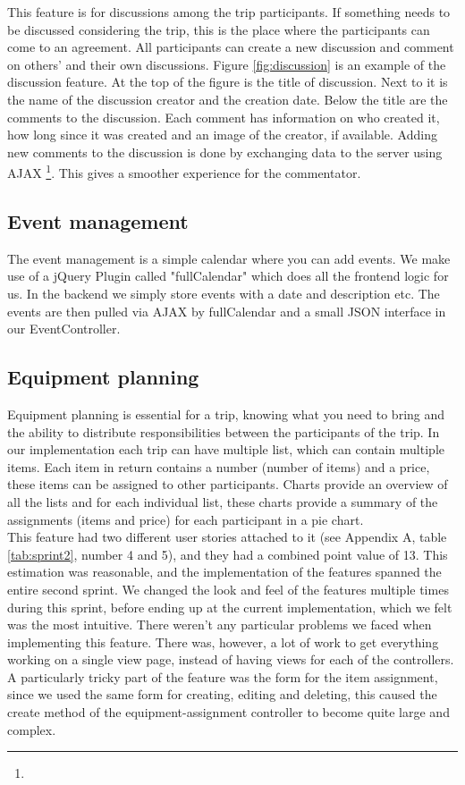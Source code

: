 \documentclass[a4paper]{article}
\begin{document}
This feature is for discussions among the trip participants. If something needs to be discussed considering the trip, this is the place where the participants can come to an agreement. All participants can create a new discussion and comment on others' and their own discussions. Figure \ref{fig:discussion} is an example of the discussion feature. At the top of the figure is the title of discussion. Next to it is the name of the discussion creator and the creation date. Below the title are the comments to the discussion. Each comment has information on who created it, how long since it was created and an image of the creator, if available. Adding new comments to the discussion is done by exchanging data to the server using AJAX \footnote{\AJAX}. This gives a smoother experience for the commentator. 

\subsection{Event management}
The event management is a simple calendar where you can add events. We make use of a jQuery Plugin called "fullCalendar" which does all the frontend logic for us. In the backend we simply store events with a date and description etc. The events are then pulled via AJAX by fullCalendar and a small JSON interface in our EventController.

\subsection{Equipment planning}
Equipment planning is essential for a trip, knowing what you need to bring and the ability to distribute responsibilities between the participants of the trip. In our implementation each trip can have multiple list, which can contain multiple items. Each item in return contains a number (number of items) and a price, these items can be assigned to other participants. Charts provide an overview of all the lists and for each individual list, these charts provide a summary of the assignments (items and price) for each participant in a pie chart. \\ This feature had two different user stories attached to it (see Appendix A, table \ref{tab:sprint2}, number 4 and 5), and they had a combined point value of 13. This estimation was reasonable, and the implementation of the features spanned the entire second sprint. We changed the look and feel of the features multiple times during this sprint, before ending up at the current implementation, which we felt was the most intuitive. There weren't any particular problems we faced when implementing this feature. There was, however, a lot of work to get everything working on a single view page, instead of having views for each of the controllers. A particularly tricky part of the feature was the form for the item assignment, since we used the same form for creating, editing and deleting, this caused the create method of the equipment-assignment controller to become quite large and complex. 
\end{document}
